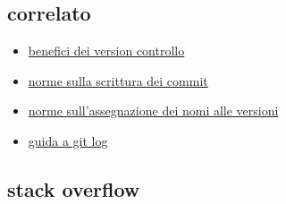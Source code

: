 \documentclass{article} \usepackage[textwidth=19cm,textheight=24cm]{geometry}
\begin{document}
\subsection{correlato}
\begin{itemize}
    \item \href{https://www.atlassian.com/git/tutorials/what-is-version-control}{benefici dei version controllo}
    \item \href{https://chris.beams.io/posts/git-commit/}{norme sulla scrittura dei commit}
    \item \href{https://semver.org/}{norme sull'assegnazione dei nomi alle versioni}
    \item \href{https://www.toolsqa.com/git/git-log/}{guida a git log}
\end{itemize}

\subsection{stack overflow}
\end{document}
